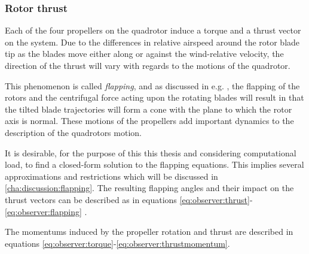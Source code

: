 \subsubsection{Rotor thrust}
\label{ssec:observer:thrust}
    Each of the four propellers on the quadrotor induce a torque
    and a thrust vector on the system.
    Due to the differences in relative airspeed around
    the rotor blade tip as the blades move either along or against
    the wind-relative velocity, the direction of the thrust will vary
    with regards to the motions of the quadrotor.

    This phenomenon is called \textit{flapping}, and as discussed
    in e.g. \citep{Pounds_modellingand}, the flapping of the rotors
    and the centrifugal force acting upon the rotating blades
    will result in that the tilted blade trajectories will
    form a cone with the plane to which the rotor axis is normal.
    These motions of the propellers add important dynamics to the
    description of the quadrotors motion.

    It is desirable, for the purpose of this this thesis and
    considering computational load, to find a closed-form
    solution to the flapping equations. This implies several
    approximations and restrictions which will be discussed in
    \ref{cha:discussion:flapping}.
    The resulting flapping angles and their impact on
    the thrust vectors can be described as in equations
    \eqref{eq:observer:thrust}-\eqref{eq:observer:flapping}
    \citep{Pounds_modellingand,prouty1995helicopter,leishman2002principles}.

    The momentums induced by the propeller rotation and thrust
    are described in equations \eqref{eq:observer:torque}-\eqref{eq:observer:thrustmomentum}.

